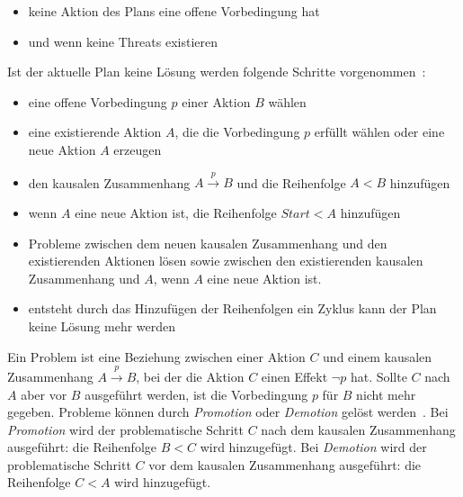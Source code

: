 \begin{itemize}
    \item keine Aktion des Plans eine offene Vorbedingung hat
    \item und wenn keine Threats existieren
\end{itemize}
Ist der aktuelle Plan keine Lösung werden folgende Schritte vorgenommen~\cite{grastien}:
\begin{itemize}
    \item eine offene Vorbedingung $p$ einer Aktion $B$ wählen
    \item eine existierende Aktion $A$, die die Vorbedingung $p$ erfüllt wählen oder eine neue Aktion $A$ erzeugen
    \item den kausalen Zusammenhang $A \xrightarrow{p} B$ und die Reihenfolge $A < B$ hinzufügen
    \item wenn $A$ eine neue Aktion ist, die Reihenfolge $Start < A$ hinzufügen
    \item Probleme zwischen dem neuen kausalen Zusammenhang und den existierenden Aktionen lösen sowie zwischen den existierenden kausalen Zusammenhang und $A$, wenn $A$ eine neue Aktion ist.
    \item entsteht durch das Hinzufügen der Reihenfolgen ein Zyklus kann der Plan keine Lösung mehr werden
\end{itemize}
Ein Problem ist eine Beziehung zwischen einer Aktion $C$ und einem kausalen Zusammenhang  $A \xrightarrow{p} B$, bei der die Aktion $C$ einen Effekt $\neg p$ hat.
Sollte $C$ nach $A$ aber vor $B$ ausgeführt werden, ist die Vorbedingung $p$ für $B$ nicht mehr gegeben.
Probleme können durch \emph{Promotion} oder \emph{Demotion} gelöst werden~\cite{dyer_2003}.
Bei \emph{Promotion} wird der problematische Schritt $C$ nach dem kausalen Zusammenhang ausgeführt: die Reihenfolge $B < C$ wird hinzugefügt.
Bei \emph{Demotion} wird der problematische Schritt $C$ vor dem kausalen Zusammenhang ausgeführt: die Reihenfolge $C < A$ wird hinzugefügt.

